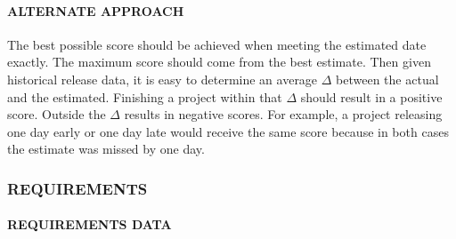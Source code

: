\documentclass[SDSUThesis.tex]{subfiles}
\begin{document}
    
            \paragraph{ALTERNATE APPROACH}
                The best possible score should be achieved
                when meeting the estimated date exactly.  The maximum score
                should come from the best estimate.  Then given historical
                release data, it is easy to determine an 
                average $\Delta$ between the actual and the estimated.  
                Finishing a project within that $\Delta$ should result 
                in a positive score.  Outside the $\Delta$ results in
                negative scores.  For example, a project releasing
                one day early or one day late would receive the same score
                because in both cases the estimate was missed by one day.



        \subsubsection{REQUIREMENTS}
            
            \paragraph{REQUIREMENTS DATA}
            
\end{document}
